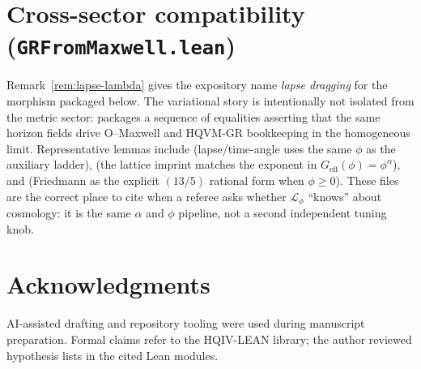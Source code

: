 \documentclass[11pt]{amsart}
\begin{document}
\section{Cross-sector compatibility (\texorpdfstring{\texttt{GRFromMaxwell.lean}}{GRFromMaxwell.lean})}
\label{app:compat}

Remark~\ref{rem:lapse-lambda} gives the expository name \emph{lapse dragging} for the morphism packaged below. The variational story is intentionally not isolated from the metric sector:  packages a sequence of equalities asserting that the same horizon fields drive O--Maxwell and HQVM-GR bookkeeping in the homogeneous limit. Representative lemmas include  (lapse/time-angle uses the same \(\phi\) as the auxiliary ladder),  (the lattice imprint matches the exponent in \(G_{\mathrm{eff}}(\phi)=\phi^{\alpha}\)), and  (Friedmann as the explicit \((13/5)\) rational form when \(\phi\ge 0\)). These files are the correct place to cite when a referee asks whether \(\mathcal{L}_\phi\) ``knows'' about cosmology: it is the same \(\alpha\) and \(\phi\) pipeline, not a second independent tuning knob.

\section*{Acknowledgments}
AI-assisted drafting and repository tooling were used during manuscript preparation. Formal claims refer to the HQIV-LEAN library; the author reviewed hypothesis lists in the cited Lean modules.
\end{document}
